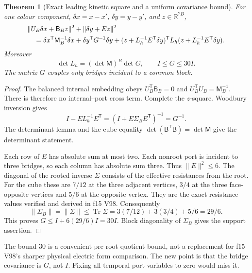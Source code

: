 \documentclass[11pt,oneside]{article}
\newtheorem{theorem}{Theorem}[section]
\DeclareMathOperator{\Tr}{Tr}
\begin{document}
\begin{theorem}[Exact leading kinetic square and a uniform covariance bound]
\label{f16v2:kinetic-square}
For one colour component, \(\delta x=x-x'\), \(\delta y=y-y'\),
and \(z\in\mathbb R^{7B}\),
\begin{align}
 &\|U_B\delta x+\mathsf B_Bz\|^2+\|\delta y+Ez\|^2
 \notag\\
 &\quad=\delta x^{\mathsf T}\mathsf M_B^{-1}\delta x
       +\delta y^{\mathsf T}G^{-1}\delta y
       +(z+L_h^{-1}E^{\mathsf T}\delta y)^{\mathsf T}
                    L_h(z+L_h^{-1}E^{\mathsf T}\delta y).
 \label{f16v2:completed-kinetic}
\end{align}
Moreover
\begin{equation}
  \det L_h=(\det\mathsf M)^B\det G,\qquad
                         I\le G\le30I.
 \label{f16v2:Gbounds}
\end{equation}
The matrix \(G\) couples only bridges incident to a common block.
\end{theorem}

\begin{proof}
The balanced internal embedding obeys
\(U_B^{\mathsf T}\mathsf B_B=0\) and
\(U_B^{\mathsf T}U_B=\mathsf M_B^{-1}\).
There is therefore no internal--port cross term.
Complete the \(z\)-square. Woodbury inversion gives
\[
 I-E L_h^{-1}E^{\mathsf T}
                    =(I+E\Sigma_BE^{\mathsf T})^{-1}=G^{-1}.
\]
The determinant lemma and the cube equality
\(\det(\mathsf B^{\mathsf T}\mathsf B)=\det\mathsf M\)
give the determinant statement.

Each row of \(E\) has absolute sum at most two. Each nonroot
port is incident to three bridges, so each column has absolute
sum three. Thus \(\|E\|^2\le6\).
The diagonal of the rooted inverse \(\Sigma\) consists of the
effective resistances from the root. For the cube these are
\(7/12\) at the three adjacent vertices, \(3/4\) at the three
face-opposite vertices and \(5/6\) at the opposite vertex.
They are the exact resistance values verified and derived
in f15 V98. Consequently
\[
 \|\Sigma_B\|=\|\Sigma\|\le\Tr\Sigma
                    =3(7/12)+3(3/4)+5/6=29/6.
\]
This proves \(G\le I+6(29/6)I=30I\).
Block diagonality of \(\Sigma_B\) gives the support assertion.
\end{proof}

The bound \(30\) is a convenient pre-root-quotient bound,
not a replacement for f15 V98's sharper physical electric
form comparison. The new point is that the bridge covariance
is \(G\), not \(I\). Fixing all temporal port variables to zero
would miss it.
\end{document}
